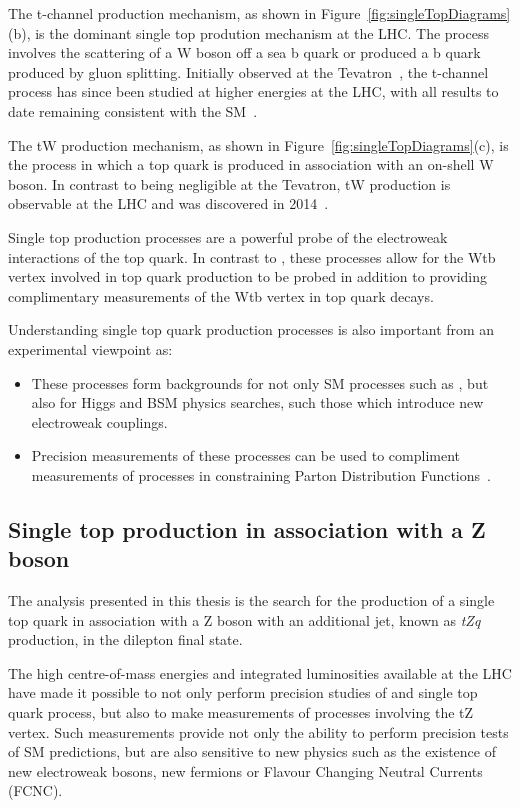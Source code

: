 The t-channel production mechanism, as shown in Figure~\ref{fig:singleTopDiagrams}(b), is the dominant single top prodution mechanism at the LHC.
The process involves the scattering of a W boson off a sea b quark or produced a b quark produced by gluon splitting.
Initially observed at the Tevatron~\cite{Aaltonen:2009jj,Abazov:2009ii}, the t-channel process has since been studied at higher energies at the LHC, with all results to date remaining consistent with the SM~\cite{Berta:2017ghf,Morton:2018wkb}.	

The tW production mechanism, as shown in Figure~\ref{fig:singleTopDiagrams}(c), is the process in which  a top quark is produced in association with an on-shell W boson.
In contrast to being negligible at the Tevatron, tW production is observable at the LHC and was discovered in 2014~\cite{Chatrchyan:2014tua}.

Single top production processes are a powerful probe of the electroweak interactions of the top quark.
In contrast to \ttbar, these processes allow for the Wtb vertex involved in top quark production to be probed in addition to providing complimentary measurements of the Wtb vertex in top quark decays.

Understanding single top quark production processes is also important from an experimental viewpoint as:
\begin{itemize}
\item These processes form backgrounds for not only SM processes such as \ttbar, but also for Higgs and BSM physics searches, such those which introduce new electroweak couplings.
\item Precision measurements of these processes can be used to compliment measurements of \ttbar processes in constraining Parton Distribution Functions~\cite{Guffanti:2010yu}.
\end{itemize}


\subsection{Single top production in association with a Z boson}\label{subsec:tZqTheory}
The analysis presented in this thesis is the search for the production of a single top quark in association with a Z boson with an additional jet, known as \emph{tZq} production, in the dilepton final state.

The high centre-of-mass energies and integrated luminosities available at the LHC have made it possible to not only perform precision studies of \ttbar and single top quark process, but also to make measurements of processes involving the tZ vertex.
Such measurements provide not only the ability to perform precision tests of SM predictions, but are also sensitive to new physics such as the existence of new electroweak bosons, new fermions or Flavour Changing Neutral Currents (FCNC).

